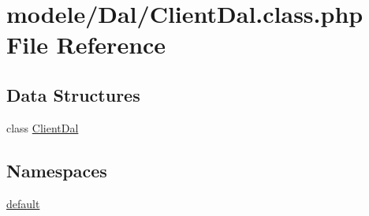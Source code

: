 \hypertarget{_client_dal_8class_8php}{}\section{modele/\+Dal/\+Client\+Dal.class.\+php File Reference}
\label{_client_dal_8class_8php}
\subsection*{Data Structures}
\begin{DoxyCompactItemize}
\item 
class \hyperlink{class_client_dal}{Client\+Dal}
\end{DoxyCompactItemize}
\subsection*{Namespaces}
\begin{DoxyCompactItemize}
\item 
 \hyperlink{namespacedefault}{default}
\end{DoxyCompactItemize}
